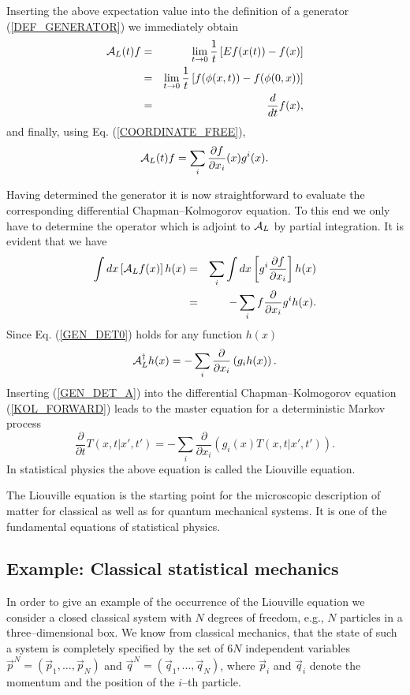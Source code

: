 Inserting the above expectation value into the definition of a 
generator (\ref{DEF_GENERATOR}) we immediately obtain
\begin{eqnarray*}
{\cal{A}}_L(t) f & = & \lim_{t\rightarrow 0} \frac{1}{t}
                        \left[ Ef(x(t)) - f(x)\right] \\
             & = & \lim_{t\rightarrow 0} \frac{1}{t}
                        \left[ f(\phi(x,t)) - f(\phi(0,x))\right] \\
              & = & \frac{d}{dt} f(x) ,
\end{eqnarray*}
and finally, using Eq. (\ref{COORDINATE_FREE}),
\begin{equation*}
{\cal{A}}_L(t) f = \sum_i \frac{\partial f}{\partial x_i}(x) g^i(x).
\end{equation*}


Having determined the generator it is now straightforward to 
evaluate the corresponding differential Chapman--Kolmogorov 
equation. To this end we only 
have to determine the operator which is adjoint to
${\cal{A}}_L$ by partial integration. It is evident that we have
\begin{eqnarray}
\label{GEN_DET0}
\int dx \left[{\cal{A}}_L f(x) \right]h(x) &=&
          \sum_i \int dx \left[g^i 
           \frac{\partial f}{\partial x_i} \right] h(x) \nonumber \\
     & = & -\sum_i f \frac{\partial}{\partial x_i} g^i h(x).      
\end{eqnarray}
Since Eq. (\ref{GEN_DET0}) holds for any function $h(x)$
\begin{equation}
\label{GEN_DET_A}
{\cal{A}}_L^{\dagger} h(x) = -\sum_i \frac{\partial}{\partial x_i}
    \left(g_i h(x) \right).
\end{equation}
Inserting (\ref{GEN_DET_A}) into the differential Chapman--Kolmogorov 
equation
(\ref{KOL_FORWARD}) 
leads to the master equation for a deterministic Markov process
\begin{equation}
\frac{\partial}{\partial t} T(x,t|x',t') =
 - \sum_i \frac{\partial}{\partial x_i}
     \left(g_i(x)T(x,t|x',t')  \right).
\end{equation}
In statistical physics the above equation is called the Liouville 
equation.
 
The Liouville equation is the starting point for the microscopic 
description of matter for classical as well as for quantum 
mechanical systems. It is one of the fundamental equations of 
statistical physics. 

\subsection{Example: Classical statistical mechanics}
In order to give an example of the occurrence
of the Liouville equation we consider a closed classical system
with $N$ degrees of freedom, e.g., $N$ particles in a 
three--dimensional box. We know from classical mechanics, that the 
state  of such a system is completely specified by the set of $6N$
independent variables $\vec{p}^N=(\vec{p}_1, \ldots, \vec{p}_N)$ 
and $\vec{q}^N=(\vec{q}_1, \ldots, \vec{q}_N)$, where $\vec{p}_i$
and $\vec{q}_i$ denote the momentum and the position of the 
$i$--th particle. 

